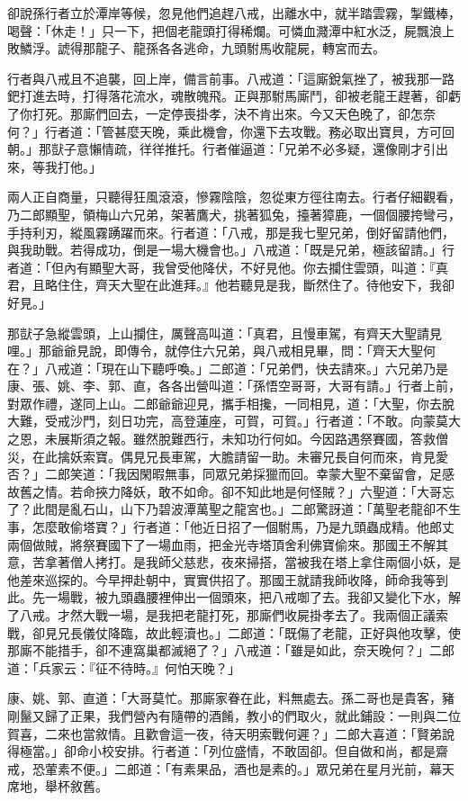 卻說孫行者立於潭岸等候，忽見他們追趕八戒，出離水中，就半踏雲霧，掣鐵棒，喝聲：「休走！」只一下，把個老龍頭打得稀爛。可憐血濺潭中紅水泛，屍飄浪上敗鱗浮。諕得那龍子、龍孫各各逃命，九頭駙馬收龍屍，轉宮而去。

行者與八戒且不追襲，回上岸，備言前事。八戒道：「這廝銳氣挫了，被我那一路鈀打進去時，打得落花流水，魂散魄飛。正與那駙馬廝鬥，卻被老龍王趕著，卻虧了你打死。那廝們回去，一定停喪掛孝，決不肯出來。今又天色晚了，卻怎奈何？」行者道：「管甚麼天晚，乘此機會，你還下去攻戰。務必取出寶貝，方可回朝。」那獃子意懶情疏，徉徉推托。行者催逼道：「兄弟不必多疑，還像剛才引出來，等我打他。」

兩人正自商量，只聽得狂風滾滾，慘霧陰陰，忽從東方徑往南去。行者仔細觀看，乃二郎顯聖，領梅山六兄弟，架著鷹犬，挑著狐兔，擡著獐鹿，一個個腰挎彎弓，手持利刃，縱風霧踴躍而來。行者道：「八戒，那是我七聖兄弟，倒好留請他們，與我助戰。若得成功，倒是一場大機會也。」八戒道：「既是兄弟，極該留請。」行者道：「但內有顯聖大哥，我曾受他降伏，不好見他。你去攔住雲頭，叫道：『真君，且略住住，齊天大聖在此進拜。』他若聽見是我，斷然住了。待他安下，我卻好見。」

那獃子急縱雲頭，上山攔住，厲聲高叫道：「真君，且慢車駕，有齊天大聖請見哩。」那爺爺見說，即傳令，就停住六兄弟，與八戒相見畢，問：「齊天大聖何在？」八戒道：「現在山下聽呼喚。」二郎道：「兄弟們，快去請來。」六兄弟乃是康、張、姚、李、郭、直，各各出營叫道：「孫悟空哥哥，大哥有請。」行者上前，對眾作禮，遂同上山。二郎爺爺迎見，攜手相攙，一同相見，道：「大聖，你去脫大難，受戒沙門，刻日功完，高登蓮座，可賀，可賀。」行者道：「不敢。向蒙莫大之恩，未展斯須之報。雖然脫難西行，未知功行何如。今因路遇祭賽國，答救僧災，在此擒妖索寶。偶見兄長車駕，大膽請留一助。未審兄長自何而來，肯見愛否？」二郎笑道：「我因閑暇無事，同眾兄弟採獵而回。幸蒙大聖不棄留會，足感故舊之情。若命挾力降妖，敢不如命。卻不知此地是何怪賊？」六聖道：「大哥忘了？此間是亂石山，山下乃碧波潭萬聖之龍宮也。」二郎驚訝道：「萬聖老龍卻不生事，怎麼敢偷塔寶？」行者道：「他近日招了一個駙馬，乃是九頭蟲成精。他郎丈兩個做賊，將祭賽國下了一場血雨，把金光寺塔頂舍利佛寶偷來。那國王不解其意，苦拿著僧人拷打。是我師父慈悲，夜來掃搭，當被我在塔上拿住兩個小妖，是他差來巡探的。今早押赴朝中，實實供招了。那國王就請我師收降，師命我等到此。先一場戰，被九頭蟲腰裡伸出一個頭來，把八戒啣了去。我卻又變化下水，解了八戒。才然大戰一場，是我把老龍打死，那廝們收屍掛孝去了。我兩個正議索戰，卻見兄長儀仗降臨，故此輕瀆也。」二郎道：「既傷了老龍，正好與他攻擊，使那廝不能措手，卻不連窩巢都滅絕了？」八戒道：「雖是如此，奈天晚何？」二郎道：「兵家云：『征不待時。』何怕天晚？」

康、姚、郭、直道：「大哥莫忙。那廝家眷在此，料無處去。孫二哥也是貴客，豬剛鬣又歸了正果，我們營內有隨帶的酒餚，教小的們取火，就此鋪設：一則與二位賀喜，二來也當敘情。且歡會這一夜，待天明索戰何遲？」二郎大喜道：「賢弟說得極當。」卻命小校安排。行者道：「列位盛情，不敢固卻。但自做和尚，都是齋戒，恐葷素不便。」二郎道：「有素果品，酒也是素的。」眾兄弟在星月光前，幕天席地，舉杯敘舊。

